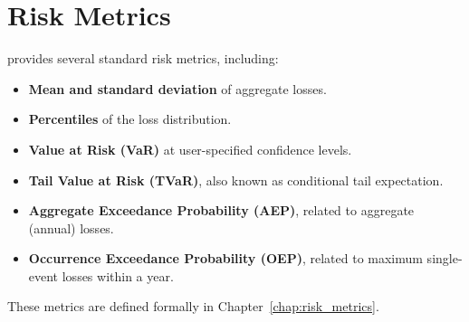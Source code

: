 \section{Risk Metrics}
\label{sec:risk_metrics_concept}

\actsim provides several standard risk metrics, including:

\begin{itemize}[leftmargin=*]
    \item \textbf{Mean and standard deviation} of aggregate losses.
    \item \textbf{Percentiles} of the loss distribution.
    \item \textbf{Value at Risk (VaR)} at user-specified confidence levels.
    \item \textbf{Tail Value at Risk (TVaR)}, also known as conditional
          tail expectation.
    \item \textbf{Aggregate Exceedance Probability (AEP)}, related to
          aggregate (annual) losses.
    \item \textbf{Occurrence Exceedance Probability (OEP)}, related to
          maximum single-event losses within a year.
\end{itemize}

These metrics are defined formally in Chapter~\ref{chap:risk_metrics}.
